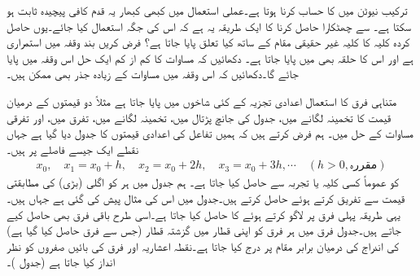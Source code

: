 \quad
ترکیب نیوٹن میں  کا حساب کرنا ہوتا ہے۔عملی استعمال میں کبھی کبھار یہ قدم کافی پیچیدہ ثابت ہو سکتا ہے۔ سے چھٹکارا حاصل کرنا کا ایک طریقہ یہ ہے کہ اس کی جگہ  استعمال کیا جائے۔یوں حاصل کردہ کلیہ کا کلیہ غیر حقیقی مقام کے ساتھ کیا تعلق پایا جاتا ہے؟
\quad
فرض کریں بند وقفہ  میں  استمراری ہے اور اس کا حلقہ بھی  میں پایا جاتا ہے۔ دکھائیں کہ مساوات  کا کم از کم ایک حل اس وقفہ میں پایا جائے گا۔دکھائیں کہ اس وقفہ میں مساوات کے زیادہ جذر بھی ممکن ہیں۔

متناہی فرق کا استعمال اعدادی تجزیہ کے کئی شاخوں میں پایا جاتا ہے مثلاً دو قیمتوں کے درمیان قیمت کا تخمینہ لگانے میں، جدول کی جانچ پڑتال میں، تخمینہ لگانے میں، تفرق میں، اور تفرقی مساوات کے حل میں۔ ہم فرض کرتے ہیں کہ ہمیں تفاعل  کی اعدادی قیمتوں   کا جدول دیا گیا ہے جہاں نقطے  ایک جیسے  فاصلے پر ہیں۔ 
\begin{align*}
x_0,\quad x_1=x_0+h,\quad x_2=x_0+2h,\quad x_3=x_0+3h,\cdots \quad (h>0, \text{مقررہ})
\end{align*}
 کو عموماً کسی کلیہ یا تجربہ سے حاصل کیا جاتا ہے۔ ہم جدول میں ہر   کو اگلی (بڑی)  کی مطابقتی قیمت سے تفریق کرتے ہوئے  حاصل کرتے ہیں۔جدول  میں اس کی مثال پیش کی گئی ہے جہاں  ہیں۔یہی طریقہ پہلی فرق پر لاگو کرتے ہوئے  کا  حاصل کیا جاتا ہے۔اسی طرح باقی فرق بھی حاصل کیے جاتے ہیں۔جدول فرق میں ہر فرق کو اپنی قطار میں گزشتہ قطار (جس سے فرق حاصل کیا گیا ہے) کی اندراج کی درمیان برابر  مقام پر درج کیا جاتا ہے۔نقطہ اعشاریہ اور فرق کی بائیں صفروں کو نظر انداز کیا جاتا ہے (جدول )۔ 

